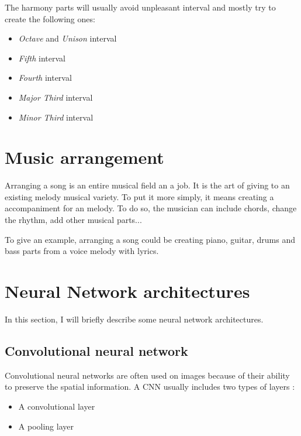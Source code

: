 \documentclass[12pt]{report}
\begin{document}
The harmony parts will usually avoid unpleasant interval and mostly try to create the following ones: 
\begin{itemize}
    \item \textit{Octave} and \textit{Unison} interval
    \item \textit{Fifth} interval
    \item \textit{Fourth} interval
    \item \textit{Major Third} interval
    \item \textit{Minor Third} interval
\end{itemize}



\section{Music arrangement}
\label{sec:back:music-arrangement}

Arranging a song is an entire musical field an a job.
It is the art of giving to an existing melody musical variety.
To put it more simply, it means creating a accompaniment for an melody.
To do so, the musician can include chords, change the rhythm, add other musical parts...

To give an example, arranging a song could be creating piano, guitar, drums and bass parts from a voice melody with lyrics.



\section{Neural Network architectures}
\label{sec:back:nn-architectures}

In this section, I will briefly describe some neural network architectures.

\subsection{Convolutional neural network}

Convolutional neural networks are often used on images because of their ability to preserve the spatial information.
A CNN usually includes two types of layers :
\begin{itemize}
    \item A convolutional layer
    \item A pooling layer
\end{itemize}
\end{document}
